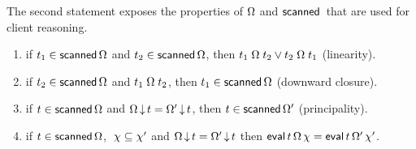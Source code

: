 The second statement exposes the properties of $\Omega$ and
$\scanned$ that are used for client reasoning.
%
\begin{invariant}\label{lem:scanned}%
%
\begin{enumerate}
 \item\label{lem:scan:total} if $ t_1 \in
   \mathsf{scanned}\,\Omega$ and $t_2 \in \mathsf{scanned}\,\Omega$, then
   $ t_1 \mathrel{\Omega} t_2 \vee t_2 \mathrel{\Omega}
   t_1 $ (linearity).
   
 \item \label{lem:scan:wkn} if $ t_2 \in
   \mathsf{scanned}\,\Omega$ and $ t_1 \mathrel{\Omega} t_2$, then
   $t_1 \in \mathsf{scanned}\,\Omega$ (downward closure).


\item \label{lem:scan:prefix} if $t \in
  \mathsf{scanned}\,\Omega$ and $ \Omega\,{\downarrow}\,t =
  \Omega'\,{\downarrow}\,t$, then $t \in \mathsf{scanned}\,\Omega'$ (principality).
  
\item \label{lem:scan:eval} if $t \in
  \mathsf{scanned}\,\Omega$, $\ \chi \subseteq \chi'$ and $
  \Omega\,{\downarrow}\,t = \Omega'\,{\downarrow}\,t$ then $ \mathsf{eval}\,
  t\, \Omega\, \chi = \mathsf{eval}\, t\, \Omega'\, \chi'$. %
\end{enumerate}
\end{invariant}


